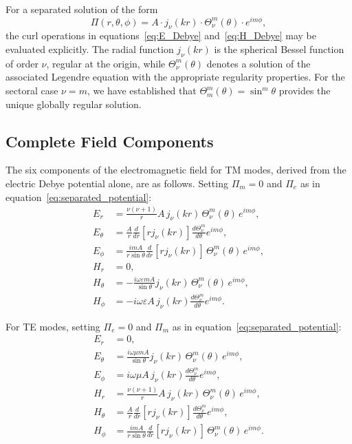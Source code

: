 \documentclass[
  aip,
  amsmath,amssymb,
  preprint
]{revtex4-1}
\begin{document}
For a separated solution of the form
\begin{equation}
\Pi(r, \theta, \phi) = A \cdot j_\nu(kr) \cdot \Theta_\nu^m(\theta) \cdot e^{im\phi},
\label{eq:separated_potential}
\end{equation}
the curl operations in equations~\eqref{eq:E_Debye} and~\eqref{eq:H_Debye} may be evaluated explicitly. The radial function $j_\nu(kr)$ is the spherical Bessel function of order $\nu$, regular at the origin, while $\Theta_\nu^m(\theta)$ denotes a solution of the associated Legendre equation with the appropriate regularity properties. For the sectoral case $\nu = m$, we have established that $\Theta_m^m(\theta) = \sin^m\theta$ provides the unique globally regular solution.


\subsection{Complete Field Components}


The six components of the electromagnetic field for TM modes, derived from the electric Debye potential alone, are as follows. Setting $\Pi_m = 0$ and $\Pi_e$ as in equation~\eqref{eq:separated_potential}:
\begin{align}
E_r &= \frac{\nu(\nu+1)}{r} A \, j_\nu(kr) \, \Theta_\nu^m(\theta) \, e^{im\phi}, \label{eq:Er_TM} \\[6pt]
E_\theta &= \frac{A}{r} \frac{d}{dr}[r j_\nu(kr)] \frac{d\Theta_\nu^m}{d\theta} e^{im\phi}, \label{eq:Etheta_TM} \\[6pt]
E_\phi &= \frac{imA}{r\sin\theta} \frac{d}{dr}[r j_\nu(kr)] \, \Theta_\nu^m(\theta) \, e^{im\phi}, \label{eq:Ephi_TM} \\[6pt]
H_r &= 0, \label{eq:Hr_TM} \\[6pt]
H_\theta &= -\frac{i\omega\varepsilon m A}{\sin\theta} j_\nu(kr) \, \Theta_\nu^m(\theta) \, e^{im\phi}, \label{eq:Htheta_TM} \\[6pt]
H_\phi &= -i\omega\varepsilon A \, j_\nu(kr) \frac{d\Theta_\nu^m}{d\theta} e^{im\phi}. \label{eq:Hphi_TM}
\end{align}

For TE modes, setting $\Pi_e = 0$ and $\Pi_m$ as in equation~\eqref{eq:separated_potential}:
\begin{align}
E_r &= 0, \label{eq:Er_TE} \\[6pt]
E_\theta &= \frac{i\omega\mu m A}{\sin\theta} j_\nu(kr) \, \Theta_\nu^m(\theta) \, e^{im\phi}, \label{eq:Etheta_TE} \\[6pt]
E_\phi &= i\omega\mu A \, j_\nu(kr) \frac{d\Theta_\nu^m}{d\theta} e^{im\phi}, \label{eq:Ephi_TE} \\[6pt]
H_r &= \frac{\nu(\nu+1)}{r} A \, j_\nu(kr) \, \Theta_\nu^m(\theta) \, e^{im\phi}, \label{eq:Hr_TE} \\[6pt]
H_\theta &= \frac{A}{r} \frac{d}{dr}[r j_\nu(kr)] \frac{d\Theta_\nu^m}{d\theta} e^{im\phi}, \label{eq:Htheta_TE} \\[6pt]
H_\phi &= \frac{imA}{r\sin\theta} \frac{d}{dr}[r j_\nu(kr)] \, \Theta_\nu^m(\theta) \, e^{im\phi}. \label{eq:Hphi_TE}
\end{align}
\end{document}
